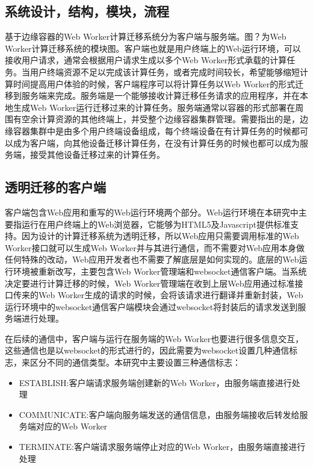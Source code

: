 \subsection{系统设计，结构，模块，流程}

基于边缘容器的Web Worker计算迁移系统分为客户端与服务端。图？为Web Worker计算迁移系统的模块图。客户端也就是用户终端上的Web运行环境，可以接收用户请求，通常会根据用户请求生成以多个Web Worker形式承载的计算任务。当用户终端资源不足以完成该计算任务，或者完成时间较长，希望能够缩短计算时间提高用户体验的时候，客户端程序可以将计算任务以Web Worker的形式迁移到服务端来完成。服务端是一个能够接收计算迁移任务请求的应用程序，并在本地生成Web Worker运行迁移过来的计算任务。服务端通常以容器的形式部署在周围有空余计算资源的其他终端上，并受整个边缘容器集群管理。需要指出的是，边缘容器集群中是由多个用户终端设备组成，每个终端设备在有计算任务的时候都可以成为客户端，向其他设备迁移计算任务，在没有计算任务的时候也都可以成为服务端，接受其他设备迁移过来的计算任务。
\subsection{透明迁移的客户端}

客户端包含Web应用和重写的Web运行环境两个部分。Web运行环境在本研究中主要指运行在用户终端上的Web浏览器，它能够为HTML5及Javascript提供标准支持。因为设计的计算迁移系统为透明迁移，所以Web应用只需要调用标准的Web Worker接口就可以生成Web Worker并与其进行通信，而不需要对Web应用本身做任何特殊的改动，Web应用开发者也不需要了解底层是如何实现的。底层的Web运行环境被重新改写，主要包含Web Worker管理端和websocket通信客户端。当系统决定要进行计算迁移的时候，Web Worker管理端在收到上层Web应用通过标准接口传来的Web Worker生成的请求的时候，会将该请求进行翻译并重新封装，Web运行环境中的websocket通信客户端模块会通过websocket将封装后的请求发送到服务端进行处理。

在后续的通信中，客户端与运行在服务端的Web Worker也要进行很多信息交互，这些通信也是以websocket的形式进行的，因此需要为websocket设置几种通信标志，来区分不同的通信类型。本研究中主要设置三种通信标志：
\begin{itemize}
    \item ESTABLISH:客户端请求服务端创建新的Web Worker，由服务端直接进行处理
    \item COMMUNICATE:客户端向服务端发送的通信信息，由服务端接收后转发给服务端对应的Web Worker
    \item TERMINATE:客户端请求服务端停止对应的Web Worker，由服务端直接进行处理
\end{itemize}

